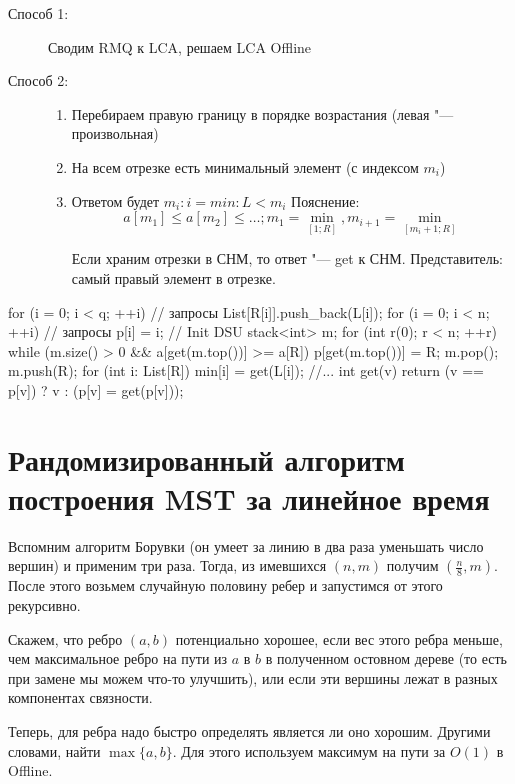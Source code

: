 \begin{description}
\item[Способ 1:]
	Сводим RMQ к LCA, решаем LCA Offline

\item[Способ 2:]
	\begin{enumerate}
	\item
		Перебираем правую границу в порядке возрастания (левая "--- произвольная)

	\item
		На всем отрезке есть минимальный элемент (с индексом $m_i$)

	\item
		Ответом будет $m_i\colon i = min\colon L < m_i$
		Пояснение:
		\[ a[m_1] \le a[m_2] \le \dots; m_1 = \min_[1; R], m_{i+1} = \min_[m_i + 1; R] \]

		Если храним отрезки в СНМ, то ответ "--- get к СНМ. Представитель: самый правый элемент в отрезке.
	\end{enumerate}
\end{description}

\begin{cppcode}
for (i = 0; i < q; ++i) // запросы
	List[R[i]].push_back(L[i]);
for (i = 0; i < n; ++i) // запросы
	p[i] = i; // Init DSU
stack<int> m;
for (int r(0); r < n; ++r)
	while (m.size() > 0 && a[get(m.top())] >= a[R])
		p[get(m.top())] = R;
		m.pop();
	m.push(R);
	for (int i: List[R])
		min[i] = get(L[i]);
//...
int get(v) {
	return (v == p[v]) ? v : (p[v] = get(p[v]));
}
\end{cppcode}

\section{Рандомизированный алгоритм построения MST за линейное время}

Вспомним алгоритм Борувки (он умеет за линию в два раза уменьшать число вершин) и применим три раза.
Тогда, из имевшихся $(n, m)$ получим $\left(\frac{n}{8}, m\right)$.
После этого возьмем случайную половину ребер и запустимся от этого рекурсивно.

Скажем, что ребро $(a, b)$ потенциально хорошее, если вес этого ребра меньше,
чем максимальное ребро на пути из $a$ в $b$ в полученном остовном дереве (то есть при замене мы можем что-то улучшить),
или если эти вершины лежат в разных компонентах связности.

Теперь, для ребра надо быстро определять является ли оно хорошим.
Другими словами, найти $\max\{a, b\}$. Для этого используем максимум на пути за $O(1)$ в Offline.

